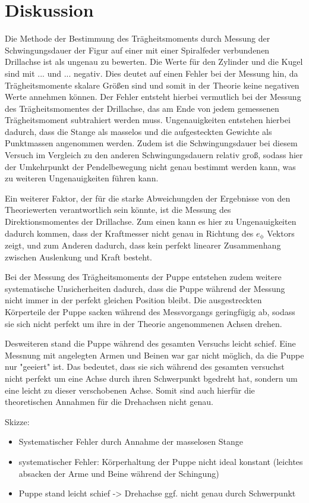\section{Diskussion}
\label{sec:Diskussion}

Die Methode der Bestimmung des Trägheitsmoments durch Messung der Schwingungsdauer
der Figur auf einer mit einer Spiralfeder verbundenen Drillachse ist als ungenau
zu bewerten.
Die Werte für den Zylinder und die Kugel sind mit ... und ... negativ. Dies
deutet auf einen Fehler bei der Messung hin, da Trägheitsmomente skalare Größen sind
und somit in der Theorie keine negativen Werte annehmen können. Der Fehler entsteht
hierbei vermutlich bei der Messung des Trägheitsmomentes der Drillachse, das am Ende
von jedem gemessenen Trägheitsmoment subtrahiert werden muss. Ungenauigkeiten entstehen
hierbei dadurch, dass die Stange als masselos und die aufgesteckten Gewichte als
Punktmassen angenommen werden. Zudem ist die Schwingungsdauer bei diesem Versuch
im Vergleich zu den anderen Schwingungsdauern relativ groß, sodass hier der Umkehrpunkt
der Pendelbewegung nicht genau bestimmt werden kann, was zu weiteren Ungenauigkeiten führen kann.

Ein weiterer Faktor, der für die starke Abweichungden der Ergebnisse von den
Theoriewerten verantwortlich sein könnte, ist die Messung des Direktionsmomentes
der Drillachse. Zum einen kann es hier zu Ungenauigkeiten dadurch kommen, dass der
Kraftmesser nicht genau in Richtung des $e_\mathrm{\phi}$ Vektors zeigt, und zum
Anderen dadurch, dass kein perfekt linearer Zusammenhang zwischen Auslenkung und Kraft
besteht.

Bei der Messung des Trägheitsmoments der Puppe entstehen zudem weitere systematische
Unsicherheiten dadurch, dass die Puppe während der Messung nicht immer in der perfekt
gleichen Position bleibt. Die ausgestreckten Körperteile der Puppe sacken während des
Messvorgangs geringfügig ab, sodass sie sich nicht perfekt um ihre in der Theorie
angenommenen Achsen drehen.

Desweiteren stand die Puppe während des gesamten Versuchs leicht schief. Eine Messnung mit
angelegten Armen und Beinen war gar nicht möglich, da die Puppe nur "geeiert" ist. Das
bedeutet, dass sie sich während des gesamten versuchst nicht perfekt um eine Achse durch
ihren Schwerpunkt bgedreht hat, sondern um eine leicht zu dieser verschobenen Achse.
Somit sind auch hierfür die theoretischen Annahmen für die Drehachsen nicht genau.




Skizze:
\begin{itemize}
  \item Systematischer Fehler durch Annahme der masselosen Stange
  \item systematischer Fehler: Körperhaltung der Puppe nicht ideal konstant (leichtes
  absacken der Arme und Beine während der Schingung)
  \item Puppe stand leicht schief -> Drehachse ggf. nicht genau durch Schwerpunkt

\end{itemize}

